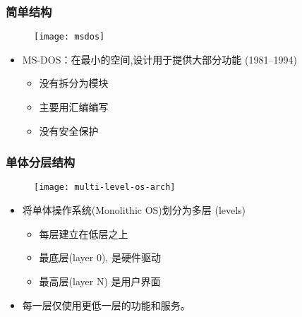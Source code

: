 \begin{frame}

\frametitle{简单结构}

\begin{figure}
	\centering
	\texttt{[image: msdos]}
\end{figure}

\begin{itemize}
\item MS-DOS：在最小的空间,设计用于提供大部分功能 (1981--1994)
    \pause
	\begin{itemize}
	\item 没有拆分为模块
	\item 主要用汇编编写
	\item 没有安全保护
	\end{itemize}
\end{itemize}

\end{frame}

\begin{frame}
	
	\frametitle{单体分层结构}
	
	\begin{figure}
		\centering
		\texttt{[image: multi-level-os-arch]}
	\end{figure}

	\pause
	
	\begin{itemize}
		\item 将单体操作系统(Monolithic OS)划分为多层 (levels)
		\begin{itemize}
			\item 每层建立在低层之上
			\item 最底层(layer 0), 是硬件驱动
			\item 最高层(layer N) 是用户界面
		\end{itemize}
	\item 每一层仅使用更低一层的功能和服务。
	\end{itemize}

\end{frame}

